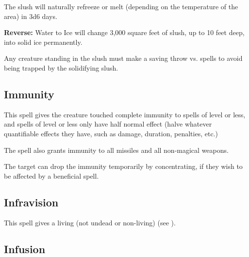 \begin{multicols*}{2}
The slush will naturally refreeze or melt (depending on the temperature of the area) in 3d6 days.

\textbf{Reverse:} \hypertarget{spell:Water to Ice}{Water to Ice} will change 3,000 square feet of slush, up to 10 feet deep, into solid ice permanently.

Any creature standing in the slush must make a saving throw vs. spells to avoid being trapped by the solidifying slush.

\subsection{Immunity}\label{spell:Immunity}

This spell gives the creature touched complete immunity to spells of  level or less, and spells of  level or less only have half normal effect (halve whatever quantifiable effects they have, such as damage, duration, penalties, etc.)

The spell also grants immunity to all missiles and all non-magical weapons.

The target can drop the immunity temporarily by concentrating, if they wish to be affected by a beneficial spell.

\subsection{Infravision}\label{spell:Infravision}

This spell gives a living (not undead or non-living)  (see ).

\subsection{Infusion}\label{spell:Infusion}
\end{multicols*}
